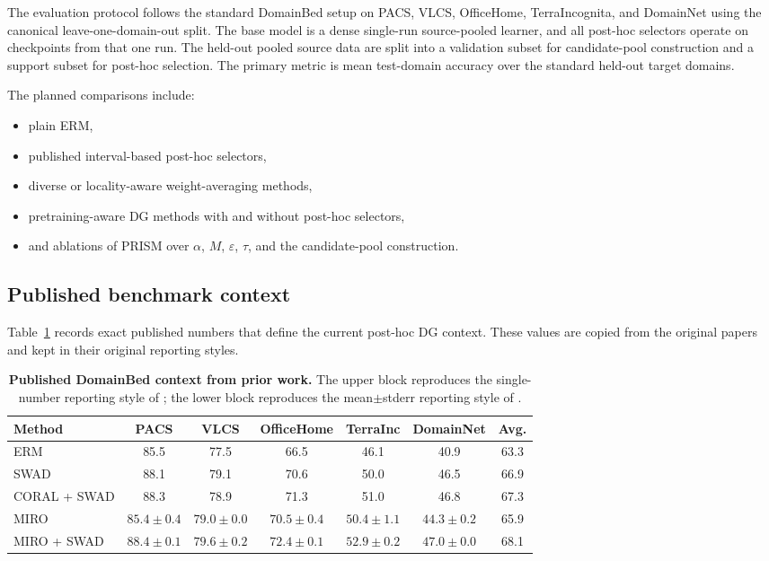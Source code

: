 \documentclass{article}
\newcommand{\prism}{\textup{\textsc{PRISM}}}
\newcommand{\swad}{\textup{\textsc{SWAD}}}
\newcommand{\miro}{\textup{\textsc{MIRO}}}
\newcommand{\erm}{\textup{\textsc{ERM}}}
\newcommand{\1}{\mathbbm{1}}
\begin{document}
The evaluation protocol follows the standard DomainBed setup \citep{gulrajani2021domainbed} on PACS, VLCS, OfficeHome, TerraIncognita, and DomainNet using the canonical leave-one-domain-out split. The base model is a dense single-run source-pooled learner, and all post-hoc selectors operate on checkpoints from that one run. The held-out pooled source data are split into a validation subset for candidate-pool construction and a support subset for post-hoc selection. The primary metric is mean test-domain accuracy over the standard held-out target domains.

The planned comparisons include:
\begin{itemize}[leftmargin=1.4em]
    \item plain \erm{},
    \item published interval-based post-hoc selectors,
    \item diverse or locality-aware weight-averaging methods,
    \item pretraining-aware DG methods with and without post-hoc selectors,
    \item and ablations of \prism{} over \(\alpha\), \(M\), \(\varepsilon\), \(\tau\), and the candidate-pool construction.
\end{itemize}

\subsection{Published benchmark context}

Table~\ref{tab:published_context} records exact published numbers that define the current post-hoc DG context. These values are copied from the original papers and kept in their original reporting styles.

\begin{table}[t]
    \centering
    \small
    \caption{\textbf{Published DomainBed context from prior work.} The upper block reproduces the single-number reporting style of \citet{cha2021swad}; the lower block reproduces the mean\(\pm\)stderr reporting style of \citet{cha2022miro}.}
    \label{tab:published_context}
    \setlength{\tabcolsep}{5pt}
    \begin{tabular}{lcccccc}
        \toprule
        Method & PACS & VLCS & OfficeHome & TerraInc & DomainNet & Avg. \\
        \midrule
        \erm{} \citep{cha2021swad} & 85.5 & 77.5 & 66.5 & 46.1 & 40.9 & 63.3 \\
        \swad{} \citep{cha2021swad} & 88.1 & 79.1 & 70.6 & 50.0 & 46.5 & 66.9 \\
        CORAL + \swad{} \citep{cha2021swad} & 88.3 & 78.9 & 71.3 & 51.0 & 46.8 & 67.3 \\
        \midrule
        \miro{} \citep{cha2022miro} & \(85.4\pm0.4\) & \(79.0\pm0.0\) & \(70.5\pm0.4\) & \(50.4\pm1.1\) & \(44.3\pm0.2\) & 65.9 \\
        \miro{} + \swad{} \citep{cha2022miro} & \(88.4\pm0.1\) & \(79.6\pm0.2\) & \(72.4\pm0.1\) & \(52.9\pm0.2\) & \(47.0\pm0.0\) & 68.1 \\
        \bottomrule
    \end{tabular}
\end{table}
\end{document}
